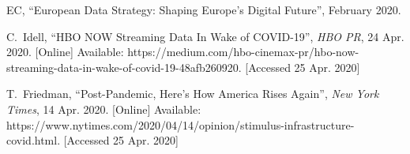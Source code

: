 \documentclass[journal]{IEEEtran}
\begin{document}
\begin{thebibliography}{6}
EC, \enquote{European Data Strategy: Shaping Europe’s Digital Future}, February 2020.

C.~Idell, \enquote{HBO NOW Streaming Data In Wake of COVID-19}, \emph{HBO PR}, 24 Apr. 2020. [Online] Available: https://medium.com/hbo-cinemax-pr/hbo-now-streaming-data-in-wake-of-covid-19-48afb260920. [Accessed 25 Apr. 2020]

T.~Friedman, \enquote{Post-Pandemic, Here’s How America
Rises Again}, \emph{New York Times}, 14 Apr. 2020. [Online] Available: https://www.nytimes.com/2020/04/14/opinion/stimulus-infrastructure-covid.html. [Accessed 25 Apr. 2020]

\end{thebibliography}




\end{document}
